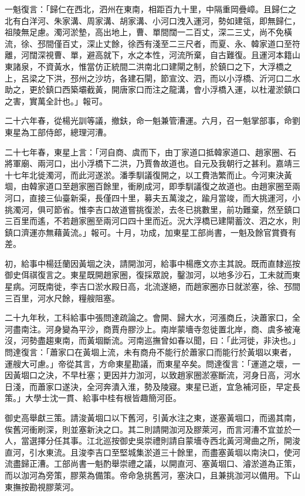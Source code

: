 一魁復言：「歸仁在西北，泗州在東南，相距百九十里，中隔重岡疊嶂。且歸仁之北有白洋河、朱家溝、周家溝、胡家溝、小河口洩入運河，勢如建瓴，即無歸仁，祖陵無足慮。濁河淤墊，高出地上，曹、單間闊一二百丈，深二三丈，尚不免橫流，徐、邳間僅百丈，深止丈餘，徐西有淺至二三尺者，而夏、永、韓家道口至符離，河闊深視曹、單，避高就下，水之本性，河流所棄，自古難復。且運河本籍山東諸泉，不資黃水，惟當仿正統間二洪南北口建閘之制，於鎮口之下，大浮橋之上，呂梁之下洪，邳州之沙坊，各建石閘，節宣汶、泗，而以小浮橋、沂河口二水助之，更於鎮口西築壩截黃，開唐家口而注之龍溝，會小浮橋入運，以杜灌淤鎮口之害，實萬全計也。」報可。

二十六年春，從楊光訓等議，撤鈇，命一魁兼管漕運。六月，召一魁掌部事，命劉東星為工部侍郎，總理河漕。

二十七年春，東星上言：「河自商、虞而下，由丁家道口抵韓家道口、趙家圈、石將軍廟、兩河口，出小浮橋下二洪，乃賈魯故道也。自元及我朝行之甚利。嘉靖三十七年北徙濁河，而此河遂淤。潘季馴議復開之，以工費浩繁而止。今河東決黃堌，由韓家道口至趙家圈百餘里，衝刷成河，即季馴議復之故道也。由趙家圈至兩河口，直接三仙臺新渠，長僅四十里，募夫五萬浚之，踰月當竣，而大挑運河，小挑濁河，俱可節省。惟李吉口故道嘗挑復淤，去冬已挑數里，前功難棄，然至鎮口三百里而遙，不若趙家圈至兩河口四十里而近。況大浮橋已建閘蓄汶、泗之水，則鎮口濟運亦無藉黃流。」報可。十月，功成，加東星工部尚書，一魁及餘官賞賚有差。

初，給事中楊廷蘭因黃堌之決，請開泇河，給事中楊應文亦主其說。既而直隸巡按御史佴祺復言之。東星既開趙家圈，復採眾說，鑿泇河，以地多沙石，工未就而東星病。河既南徙，李吉口淤水殿日高，北流遂絕，而趙家圈亦日就淤塞，徐、邳間三百里，河水尺餘，糧艘阻塞。

二十九年秋，工科給事中張問達疏論之。會開、歸大水，河漲商丘，決蕭家口，全河盡南注。河身變為平沙，商賈舟膠沙上。南岸蒙墻寺忽徙置北岸，商、虞多被淹沒，河勢盡趨東南，而黃堌斷流。河南巡撫曾如春以聞，曰：「此河徙，非決也。」問達復言：「蕭家口在黃堌上流，未有商舟不能行於蕭家口而能行於黃堌以東者，運艘大可慮。」帝從其言，方命東星勘議，而東星卒矣。問達復言：「運道之壞，一因黃堌口之決，不早杜塞；更因并力泇河，以致趙家圈淤塞斷流，河身日高，河水日淺，而蕭家口遂決，全河奔潰入淮，勢及陵寢。東星已逝，宜急補河臣，早定長策。」大學士沈一貫、給事中桂有根皆趣簡河臣。

御史高舉獻三策。請浚黃堌口以下舊河，引黃水注之東，遂塞黃堌口，而遏其南，俟舊河衝刷深，則並塞新決之口。其二則請開泇河及膠萊河，而言河漕不宜並於一人，當選擇分任其事。江北巡按御史吳崇禮則請自蒙墻寺西北黃河灣曲之所，開浚直河，引水東流。且浚李吉口至堅城集淤道三十餘里，而盡塞黃堌以南決口，使河流盡歸正漕。工部尚書一魁酌舉崇禮之議，以開直河、塞黃堌口、濬淤道為正策，而以泇河為旁策，膠萊為備策。帝命急挑舊河，塞決口，且兼挑泇河以備用。下山東撫按勘視膠萊河。


